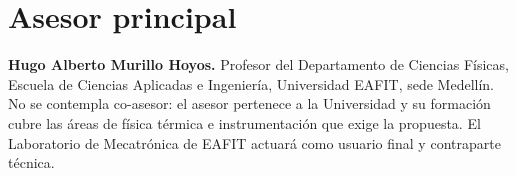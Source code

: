 \section{Asesor principal}
\textbf{Hugo Alberto Murillo Hoyos.} Profesor del Departamento de Ciencias Físicas, Escuela de Ciencias Aplicadas e Ingeniería, Universidad EAFIT, sede Medellín. No se contempla co-asesor: el asesor pertenece a la Universidad y su formación cubre las áreas de física térmica e instrumentación que exige la propuesta. El Laboratorio de Mecatrónica de EAFIT actuará como usuario final y contraparte técnica.
